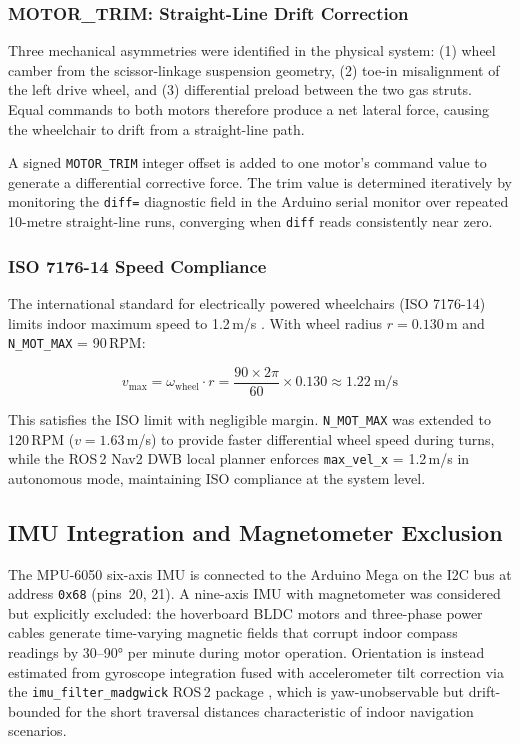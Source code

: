 \documentclass[12pt,a4paper]{report}
\begin{document}
\subsubsection{MOTOR\_TRIM: Straight-Line Drift Correction}
\label{subsec:motor_trim_impl}

Three mechanical asymmetries were identified in the physical system:
(1) wheel camber from the scissor-linkage suspension geometry,
(2) toe-in misalignment of the left drive wheel, and
(3) differential preload between the two gas struts. Equal commands to both
motors therefore produce a net lateral force, causing the wheelchair to drift
from a straight-line path.

A signed \texttt{MOTOR\_TRIM} integer offset is added to one motor's command
value to generate a differential corrective force. The trim value is determined
iteratively by monitoring the \texttt{diff=} diagnostic field in the Arduino
serial monitor over repeated 10-metre straight-line runs, converging when
\texttt{diff} reads consistently near zero.

\subsubsection{ISO 7176-14 Speed Compliance}
\label{subsec:iso_speed_impl}

The international standard for electrically powered wheelchairs (ISO 7176-14)
limits indoor maximum speed to 1.2\,m/s \cite{iso7176}. With wheel radius
$r = 0.130$\,m and \texttt{N\_MOT\_MAX} = 90\,RPM:

\begin{equation}
  v_\text{max} = \omega_\text{wheel} \cdot r
  = \frac{90 \times 2\pi}{60} \times 0.130 \approx \SI{1.22}{\metre\per\second}
  \label{eq:vmax_impl}
\end{equation}

This satisfies the ISO limit with negligible margin. \texttt{N\_MOT\_MAX} was
extended to 120\,RPM ($v = 1.63$\,m/s) to provide faster differential wheel
speed during turns, while the ROS\,2 Nav2 DWB local planner enforces
\texttt{max\_vel\_x} = 1.2\,m/s in autonomous mode, maintaining ISO
compliance at the system level.

\subsection{IMU Integration and Magnetometer Exclusion}
\label{sec:imu_impl}

The MPU-6050 six-axis IMU is connected to the Arduino Mega on the I2C bus at
address \texttt{0x68} (pins~20, 21). A nine-axis IMU with magnetometer was
considered but explicitly excluded: the hoverboard BLDC motors and three-phase
power cables generate time-varying magnetic fields that corrupt indoor compass
readings by 30–90° per minute during motor operation. Orientation is instead
estimated from gyroscope integration fused with accelerometer tilt correction
via the \texttt{imu\_filter\_madgwick} ROS\,2 package
\cite{madgwick2010imu}, which is yaw-unobservable but drift-bounded for the
short traversal distances characteristic of indoor navigation scenarios.
\end{document}
